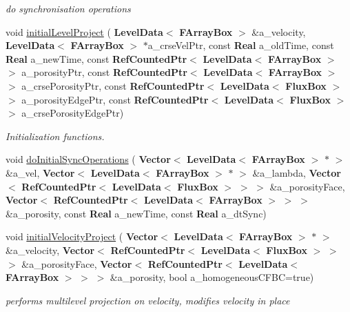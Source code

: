 \begin{DoxyCompactItemize}
\begin{DoxyCompactList}\small\item\em do synchronisation operations \end{DoxyCompactList}\item 
void \hyperlink{class_projector_a4bacdf13f2e4a10653e04042bef587f6}{initial\+Level\+Project} (\textbf{ Level\+Data}$<$ \textbf{ F\+Array\+Box} $>$ \&a\+\_\+velocity, \textbf{ Level\+Data}$<$ \textbf{ F\+Array\+Box} $>$ $\ast$a\+\_\+crse\+Vel\+Ptr, const \textbf{ Real} a\+\_\+old\+Time, const \textbf{ Real} a\+\_\+new\+Time, const \textbf{ Ref\+Counted\+Ptr}$<$ \textbf{ Level\+Data}$<$ \textbf{ F\+Array\+Box} $>$ $>$ a\+\_\+porosity\+Ptr, const \textbf{ Ref\+Counted\+Ptr}$<$ \textbf{ Level\+Data}$<$ \textbf{ F\+Array\+Box} $>$ $>$ a\+\_\+crse\+Porosity\+Ptr, const \textbf{ Ref\+Counted\+Ptr}$<$ \textbf{ Level\+Data}$<$ \textbf{ Flux\+Box} $>$ $>$ a\+\_\+porosity\+Edge\+Ptr, const \textbf{ Ref\+Counted\+Ptr}$<$ \textbf{ Level\+Data}$<$ \textbf{ Flux\+Box} $>$ $>$ a\+\_\+crse\+Porosity\+Edge\+Ptr)
\begin{DoxyCompactList}\small\item\em Initialization functions. \end{DoxyCompactList}\item 
void \hyperlink{class_projector_a09145be377ec504e0412ce78207448fe}{do\+Initial\+Sync\+Operations} (\textbf{ Vector}$<$ \textbf{ Level\+Data}$<$ \textbf{ F\+Array\+Box} $>$ $\ast$ $>$ \&a\+\_\+vel, \textbf{ Vector}$<$ \textbf{ Level\+Data}$<$ \textbf{ F\+Array\+Box} $>$ $\ast$ $>$ \&a\+\_\+lambda, \textbf{ Vector}$<$ \textbf{ Ref\+Counted\+Ptr}$<$ \textbf{ Level\+Data}$<$ \textbf{ Flux\+Box} $>$ $>$ $>$ \&a\+\_\+porosity\+Face, \textbf{ Vector}$<$ \textbf{ Ref\+Counted\+Ptr}$<$ \textbf{ Level\+Data}$<$ \textbf{ F\+Array\+Box} $>$ $>$ $>$ \&a\+\_\+porosity, const \textbf{ Real} a\+\_\+new\+Time, const \textbf{ Real} a\+\_\+dt\+Sync)
\item 
void \hyperlink{class_projector_ad4afeedf8d3cbac3778b4952aa967be2}{initial\+Velocity\+Project} (\textbf{ Vector}$<$ \textbf{ Level\+Data}$<$ \textbf{ F\+Array\+Box} $>$ $\ast$ $>$ \&a\+\_\+velocity, \textbf{ Vector}$<$ \textbf{ Ref\+Counted\+Ptr}$<$ \textbf{ Level\+Data}$<$ \textbf{ Flux\+Box} $>$ $>$ $>$ \&a\+\_\+porosity\+Face, \textbf{ Vector}$<$ \textbf{ Ref\+Counted\+Ptr}$<$ \textbf{ Level\+Data}$<$ \textbf{ F\+Array\+Box} $>$ $>$ $>$ \&a\+\_\+porosity, bool a\+\_\+homogeneous\+C\+F\+BC=true)
\begin{DoxyCompactList}\small\item\em performs multilevel projection on velocity, modifies velocity in place \end{DoxyCompactList}\item 

\end{DoxyCompactItemize}
